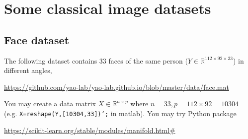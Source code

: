 \documentclass[11pt]{article}
\def\R{{\mathbb R}}
\begin{document}
%
%
%
%
%
%

\section{Some classical image datasets}

\subsection{Face dataset}

The following dataset contains 33 faces of the same person ($Y\in \R^{112\times 92\times33}$) in different angles,

\url{https://github.com/yao-lab/yao-lab.github.io/blob/master/data/face.mat}

You may create a data matrix $X\in \R^{n\times p}$ where $n=33,p=112\times92=10304$ \\ (e.g. {\texttt{X=reshape(Y,[10304,33])';}} in matlab). You may try Python package 

\url{https://scikit-learn.org/stable/modules/manifold.html#}
\end{document}
